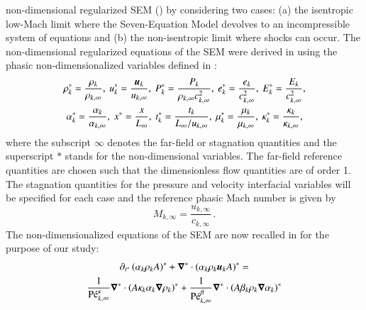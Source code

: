 \documentclass[preprint,10pt]{elsarticle}
\begin{document}
\begin{enumerate}
non-dimensional regularized SEM () by considering two cases: (a) the isentropic low-Mach limit where the 
Seven-Equation Model devolves to an incompressible system of 
equations and (b) the non-isentropic limit where shocks can occur. The non-dimensional regularized 
equations of the SEM were derived in \cite{Marco_paper_sem} using the phasic non-dimensionalized variables defined in :
%
\begin{multline}
\label{eq:norm_param}
\rho_k^*   = \frac{\rho_k}{\rho_{k,\infty}}           ,\
u_k^*      = \frac{\boldsymbol u_k}{u_{k,\infty}}                 ,\
P_k^*      = \frac{P_k}{\rho_{k,\infty} c^2_{k,\infty}}   ,\
e_k^*      = \frac{e_k}{c^2_{k,\infty} }              , \
E_k^*      = \frac{E_k}{c^2_{k,\infty} }              , \\
\alpha_k^*      = \frac{\alpha_k}{\alpha_{k,\infty} }              , \
x^* = \frac{x}{L_\infty}                      ,\
t_k^* = \frac{t_k}{L_\infty / u_{k,\infty}}           ,\
\mu_k^*    = \frac{\mu_k}{\mu_{k,\infty}}             ,\
\kappa_k^* = \frac{\kappa_k}{\kappa_{k,\infty}}       ,
\end{multline}
%
where  the subscript $\infty$ denotes the far-field or stagnation quantities and the superscript $*$ stands for the non-dimensional variables.
The far-field reference quantities are chosen such that the dimensionless flow quantities are of order 1. The stagnation quantities for 
the pressure and velocity interfacial variables will be specified for each case and the reference phasic Mach number is given by
%
\begin{equation}
M_{k,\infty} = \frac{u_{k,\infty}}{c_{k,\infty}} \,.
\end{equation}
%
The non-dimensionalized equations of the SEM are now recalled in \eqt{eq:sev_equ_case_one_scaled} for the purpose of our study:
% 
\begin{subequations}\label{eq:sev_equ_case_one_scaled}
%
\begin{multline}\label{eq:sev_equ-with-diss-terms-cont_case_one_scaled}
\partial_{t^*} \left( \alpha_k \rho_k A \right)^* + \grad^* \cdot \left( \alpha_k \rho_k \mbold u_k A \right)^* = \\ \frac{1}{\Pe^\kappa_{k,\infty}}\grad^* \cdot \left(A 
\kappa_k \alpha_k \grad \rho_k \right)^* +
\frac{1}{\Pe_{k,\infty}^\beta} \grad^* \cdot \left( A \beta_k \rho_k \grad \alpha_k \right)^*
\end{multline}
%
\begin{multline}\label{eq:sev_equ-with-diss-terms-mom_case_one_scaled}

\end{multline}
\end{subequations}
\end{enumerate}
\end{document}
